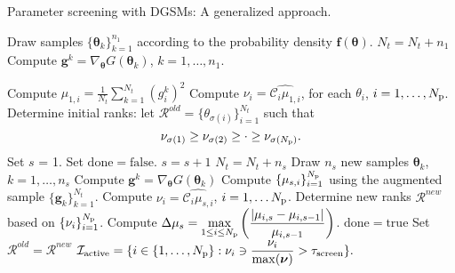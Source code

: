 \clearpage

\begin{breakablealgorithm}
  \caption{Parameter screening with DGSMs: A generalized approach.}
  \begin{algorithmic}[1]
      \State Draw samples $\{ \bm{\theta}_k \}_{k = 1}^{n_1}$ 
       according to the probability density $\bm{f(\theta)}$.
       \State $N_t = N_t + n_1$
      \State Compute $\bm{g}^k = \nabla_{\bm{\theta}}G(\bm\theta_k)$, 
             $k = 1, \ldots, n_1$. 

      \State Compute 
      $\mu_{1, i} = \frac{1}{N_t} \sum_{k = 1}^{N_t} (g^k_i)^2$
      \State Compute $\nu_i = \widehat{\mathcal{C}_i\mu_{1,i}}$, for each $\theta_i$, 
             $i = 1, \ldots, {N_\text{p}}$. 
      \State Determine initial ranks: 
            let $\mathcal{R}^{old} = \{ \theta_{\sigma(i)}\}_{i=1}^{N_t}$ such that 
\[
   \nu_{\sigma(1)} \geq \nu_{\sigma(2)} \geq \cdot \geq \nu_{\sigma({N_\text{p}})}. 
\]
      \State Set $s$ = 1.
      \State Set $\mathrm{done} = \mathrm{false}$.
        \State $s = s + 1$
        \State $N_t = N_t + n_s$
        \State Draw $n_s$ new samples 
                  $\bm{\theta}_k$, $k = 1, \ldots, n_s$
        \State Compute $\bm{g}^k = \nabla_{\bm{\theta}}G(\bm\theta_k)$
        \State Compute $\{ \mu_{s,i} \}_{i=1}^{N_\text{p}}$ using the augmented sample 
               $\{\bm{g}_k \}_{k = 1}^{N_t}$.
        \State Compute $\nu_i = \widehat{\mathcal{C}_i\mu_{s,i}}$, $i = 1, \ldots {N_\text{p}}$.
        \State Determine new ranks $\mathcal{R}^{new}$ based on $\{\nu_i\}_{i=1}^{N_\text{p}}$. 
        \State Compute $\displaystyle\Delta\mu_s = \max_{1\leq i \leq {N_\text{p}}}
               \left(\frac{|\mu_{i,s} - \mu_{i,s-1}|}{ \mu_{i,s-1}}\right)$.
         \State $\mathrm{done} = \mathrm{true}$
      \Else
          \State Set $\mathcal{R}^{old} = \mathcal{R}^{new}$
      \EndIf
    \EndWhile
    \State $\mathcal{I}_\text{active} = \{ i \in \{1, \ldots, {N_\text{p}}\} : \nu_i \ni \displaystyle\frac{\nu_i}{\max(\bm{\nu})}> \tau_\text{screen}\}.$
    
    \EndProcedure
  \end{algorithmic}
  \label{alg:screen}
\end{breakablealgorithm}

